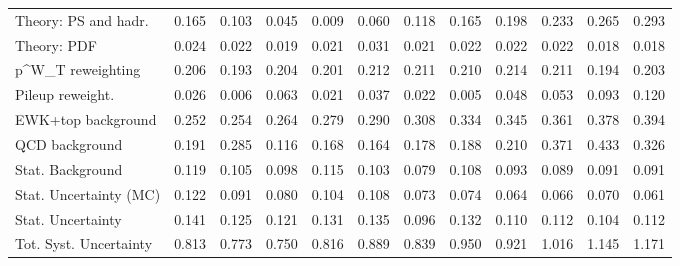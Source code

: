 \begin{tabular}{l|p{0.6cm}p{0.6cm}p{0.6cm}p{0.6cm}p{0.6cm}p{0.6cm}p{0.6cm}p{0.6cm}p{0.6cm}p{0.6cm}p{0.6cm}}
Theory: PS and hadr.                     & 0.165 & 0.103 & 0.045 & 0.009 & 0.060 & 0.118 & 0.165 & 0.198 & 0.233 & 0.265 & 0.293 \\
Theory: PDF                              & 0.024 & 0.022 & 0.019 & 0.021 & 0.031 & 0.021 & 0.022 & 0.022 & 0.022 & 0.018 & 0.018 \\
p^{W}_{T} reweighting                    & 0.206 & 0.193 & 0.204 & 0.201 & 0.212 & 0.211 & 0.210 & 0.214 & 0.211 & 0.194 & 0.203 \\
Pileup reweight.                         & 0.026 & 0.006 & 0.063 & 0.021 & 0.037 & 0.022 & 0.005 & 0.048 & 0.053 & 0.093 & 0.120 \\
EWK+top background                       & 0.252 & 0.254 & 0.264 & 0.279 & 0.290 & 0.308 & 0.334 & 0.345 & 0.361 & 0.378 & 0.394 \\
QCD background                           & 0.191 & 0.285 & 0.116 & 0.168 & 0.164 & 0.178 & 0.188 & 0.210 & 0.371 & 0.433 & 0.326 \\
Stat. Background                         & 0.119 & 0.105 & 0.098 & 0.115 & 0.103 & 0.079 & 0.108 & 0.093 & 0.089 & 0.091 & 0.091 \\
Stat. Uncertainty (MC)                   & 0.122 & 0.091 & 0.080 & 0.104 & 0.108 & 0.073 & 0.074 & 0.064 & 0.066 & 0.070 & 0.061 \\
\hline
Stat. Uncertainty                        & 0.141 & 0.125 & 0.121 & 0.131 & 0.135 & 0.096 & 0.132 & 0.110 & 0.112 & 0.104 & 0.112 \\
\hline
Tot. Syst. Uncertainty                   & 0.813 & 0.773 & 0.750 & 0.816 & 0.889 & 0.839 & 0.950 & 0.921 & 1.016 & 1.145 & 1.171 \\
\hline
\end{tabular}
